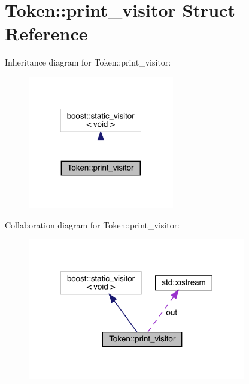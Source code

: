 \hypertarget{struct_token_1_1print__visitor}{}\section{Token\+:\+:print\+\_\+visitor Struct Reference}
\label{struct_token_1_1print__visitor}


Inheritance diagram for Token\+:\+:print\+\_\+visitor\+:\nopagebreak
\begin{figure}[H]
\begin{center}
\leavevmode
\includegraphics[width=181pt]{struct_token_1_1print__visitor__inherit__graph}
\end{center}
\end{figure}


Collaboration diagram for Token\+:\+:print\+\_\+visitor\+:\nopagebreak
\begin{figure}[H]
\begin{center}
\leavevmode
\includegraphics[width=270pt]{struct_token_1_1print__visitor__coll__graph}
\end{center}
\end{figure}
